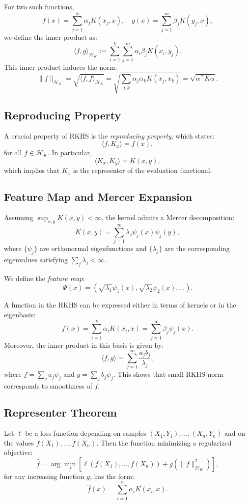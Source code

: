 \documentclass[twoside,11pt]{article}
\begin{document}
For two such functions,
\[
f(x) = \sum_{j=1}^k \alpha_j K(x_j, x), \quad g(x) = \sum_{j=1}^m \beta_j K(y_j, x),
\]
we define the inner product as:
\[
\langle f, g \rangle_{\mathcal{H}_K} := \sum_{i=1}^k \sum_{j=1}^m \alpha_i \beta_j K(x_i, y_j).
\]
This inner product induces the norm:
\[
\|f\|_{\mathcal{H}_K} = \sqrt{\langle f, f \rangle_{\mathcal{H}_K}} = \sqrt{\sum_{j,k} \alpha_j \alpha_k K(x_j, x_k)} = \sqrt{\alpha^\top K \alpha}.
\]

\subsection{Reproducing Property}

A crucial property of RKHS is the \emph{reproducing property}, which states:
\[
\langle f, K_x \rangle = f(x),
\]
for all \( f \in \mathcal{H}_K \). In particular,
\[
\langle K_x, K_y \rangle = K(x, y),
\]
which implies that \( K_x \) is the representer of the evaluation functional.

\subsection{Feature Map and Mercer Expansion}

Assuming \( \sup_{x,y} K(x,y) < \infty \), the kernel admits a Mercer decomposition:
\[
K(x, y) = \sum_{j=1}^\infty \lambda_j \psi_j(x) \psi_j(y),
\]
where \( \{ \psi_j \} \) are orthonormal eigenfunctions and \( \{ \lambda_j \} \) are the corresponding eigenvalues satisfying \( \sum_j \lambda_j < \infty \).

We define the \emph{feature map}:
\[
\Phi(x) = \left( \sqrt{\lambda_1} \psi_1(x), \sqrt{\lambda_2} \psi_2(x), \ldots \right).
\]

A function in the RKHS can be expressed either in terms of kernels or in the eigenbasis:
\[
f(x) = \sum_{i=1}^k \alpha_i K(x_i, x) = \sum_{j=1}^\infty \beta_j \psi_j(x).
\]
Moreover, the inner product in this basis is given by:
\[
\langle f, g \rangle = \sum_{j=1}^\infty \frac{a_j b_j}{\lambda_j},
\]
where \( f = \sum_j a_j \psi_j \) and \( g = \sum_j b_j \psi_j \). This shows that small RKHS norm corresponds to smoothness of \( f \).

\subsection{Representer Theorem}

Let \( \ell \) be a loss function depending on samples \( (X_1, Y_1), \ldots, (X_n, Y_n) \) and on the values \( f(X_1), \ldots, f(X_n) \). Then the function minimizing a regularized objective:
\[
\hat{f} = \arg\min_f \left[ \ell(f(X_1), \ldots, f(X_n)) + g(\|f\|_{\mathcal{H}_K}^2) \right],
\]
for any increasing function \( g \), has the form:
\[
\hat{f}(x) = \sum_{i=1}^n \alpha_i K(x_i, x).
\]
\end{document}

